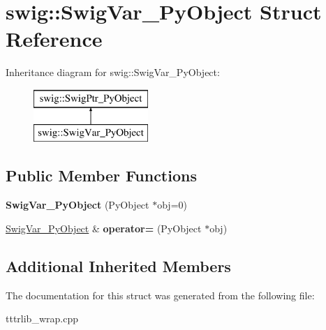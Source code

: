 \hypertarget{structswig_1_1_swig_var___py_object}{}\section{swig\+:\+:Swig\+Var\+\_\+\+Py\+Object Struct Reference}
\label{structswig_1_1_swig_var___py_object}
Inheritance diagram for swig\+:\+:Swig\+Var\+\_\+\+Py\+Object\+:\begin{figure}[H]
\begin{center}
\leavevmode
\includegraphics[height=2.000000cm]{structswig_1_1_swig_var___py_object}
\end{center}
\end{figure}
\subsection*{Public Member Functions}
\begin{DoxyCompactItemize}
\item 
\mbox{\label{structswig_1_1_swig_var___py_object_a2b61f843215bceaff8ec2ea6e92d46c2}} 
{\bfseries Swig\+Var\+\_\+\+Py\+Object} (Py\+Object $\ast$obj=0)
\item 
\mbox{\label{structswig_1_1_swig_var___py_object_a7e6053b64cf6e787b99a67b09cdc6d89}} 
\hyperlink{structswig_1_1_swig_var___py_object}{Swig\+Var\+\_\+\+Py\+Object} \& {\bfseries operator=} (Py\+Object $\ast$obj)
\end{DoxyCompactItemize}
\subsection*{Additional Inherited Members}


The documentation for this struct was generated from the following file\+:\begin{DoxyCompactItemize}
\item 
tttrlib\+\_\+wrap.\+cpp\end{DoxyCompactItemize}

